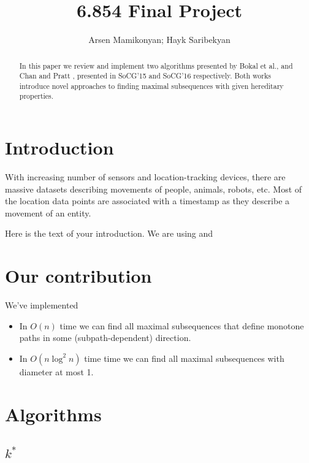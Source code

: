 \documentclass{article}
\begin{document}
\title{6.854 Final Project}
\author{Arsen Mamikonyan; Hayk Saribekyan}


\maketitle

\begin{abstract}
    In this paper we review and implement two algorithms presented by Bokal et al.\cite{bokal_et_al:LIPIcs:2015:5113}, and Chan and Pratt \cite{chan_et_al:LIPIcs:2016:5920}, presented in SoCG'15 and SoCG'16 respectively. Both works introduce novel approaches to finding maximal subsequences with given hereditary properties.
\end{abstract}

\section{Introduction}

With increasing number of sensors and location-tracking devices, there are massive datasets describing movements of people, animals, robots, etc. Most of the location data points are associated with a timestamp as they describe a movement of an entity.

Here is the text of your introduction.
We are using \cite{bokal_et_al:LIPIcs:2015:5113} and \cite{chan_et_al:LIPIcs:2016:5920}

\section{Our contribution}
We've implemented
\begin{itemize}
\item In $O(n)$ time  we  can  find  all  maximal  subsequences  that  define  monotone  paths  in  some (subpath-dependent) direction. \cite{bokal_et_al:LIPIcs:2015:5113} 
\item In $O(n \log^2 n)$ time time we can find all maximal subsequences with diameter at most 1. \cite{chan_et_al:LIPIcs:2016:5920}
\end{itemize}

\section{Algorithms}
\subsection{$k^*$}
\end{document}
